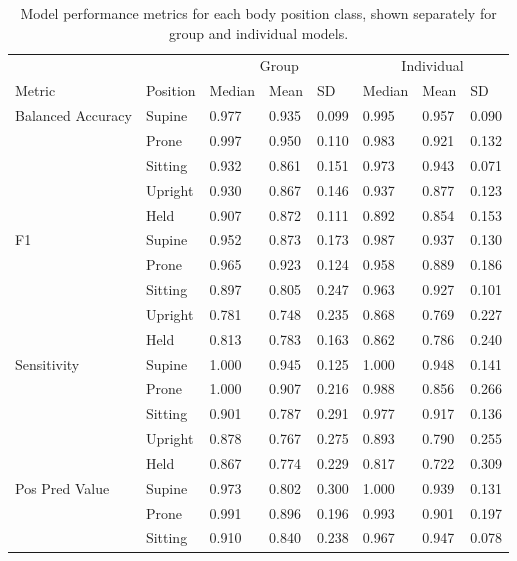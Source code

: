 \documentclass[
  man]{apa6}
\begin{document}
\begin{table}[tbp]

\begin{center}
\begin{threeparttable}

\caption{\label{tab:metricsbyclass}Model performance metrics for each body position class, shown separately for group and individual models.}

\begin{tabular}{llllllll}
\toprule
 &  & \multicolumn{3}{c}{Group} & \multicolumn{3}{c}{Individual} \\
\cmidrule(r){3-5} \cmidrule(r){6-8}
Metric & Position & Median & Mean & SD & Median & Mean & SD\\
\midrule
Balanced Accuracy & Supine & 0.977 & 0.935 & 0.099 & 0.995 & 0.957 & 0.090\\
 & Prone & 0.997 & 0.950 & 0.110 & 0.983 & 0.921 & 0.132\\
 & Sitting & 0.932 & 0.861 & 0.151 & 0.973 & 0.943 & 0.071\\
 & Upright & 0.930 & 0.867 & 0.146 & 0.937 & 0.877 & 0.123\\
 & Held & 0.907 & 0.872 & 0.111 & 0.892 & 0.854 & 0.153\\ \midrule
F1 & Supine & 0.952 & 0.873 & 0.173 & 0.987 & 0.937 & 0.130\\
 & Prone & 0.965 & 0.923 & 0.124 & 0.958 & 0.889 & 0.186\\
 & Sitting & 0.897 & 0.805 & 0.247 & 0.963 & 0.927 & 0.101\\
 & Upright & 0.781 & 0.748 & 0.235 & 0.868 & 0.769 & 0.227\\
 & Held & 0.813 & 0.783 & 0.163 & 0.862 & 0.786 & 0.240\\ \midrule
Sensitivity & Supine & 1.000 & 0.945 & 0.125 & 1.000 & 0.948 & 0.141\\
 & Prone & 1.000 & 0.907 & 0.216 & 0.988 & 0.856 & 0.266\\
 & Sitting & 0.901 & 0.787 & 0.291 & 0.977 & 0.917 & 0.136\\
 & Upright & 0.878 & 0.767 & 0.275 & 0.893 & 0.790 & 0.255\\
 & Held & 0.867 & 0.774 & 0.229 & 0.817 & 0.722 & 0.309\\ \midrule
Pos Pred Value & Supine & 0.973 & 0.802 & 0.300 & 1.000 & 0.939 & 0.131\\
 & Prone & 0.991 & 0.896 & 0.196 & 0.993 & 0.901 & 0.197\\
 & Sitting & 0.910 & 0.840 & 0.238 & 0.967 & 0.947 & 0.078\\

\end{tabular}
\end{threeparttable}
\end{center}
\end{table}
\end{document}
